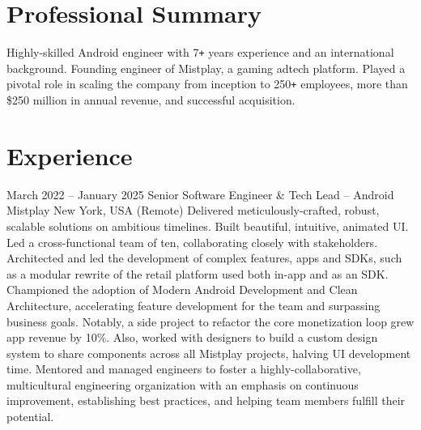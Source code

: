 \documentclass[10pt,a4paper,sans]{moderncv} %
\newcommand{\vs}[0]{\smallskip}
\begin{document}
\makecvtitle %
\vspace{-0.9cm}


\section{Professional Summary}
\vspace{-0.8mm}
Highly-skilled Android engineer with 7\texttt{+} years experience and an international background. Founding engineer of Mistplay, a gaming adtech platform. Played a pivotal role in scaling the company from inception to 250\texttt{+} employees, more than \$250 million in annual revenue, and successful acquisition. 


\section{Experience}


\cventry
{March 2022 -- January 2025}
{Senior Software Engineer \& Tech Lead -- Android}
{{Mistplay}}
{New York, USA (Remote)}
{}{
	Delivered meticulously-crafted, robust, scalable solutions on ambitious timelines. Built beautiful, intuitive, animated UI.
	Led a cross-functional team of ten, collaborating closely with stakeholders.
	Architected and led the development of complex features, apps and SDKs, such as a modular rewrite of the retail platform used both in-app and as an SDK.
	Championed the adoption of Modern Android Development and Clean Architecture, accelerating feature development for the team and surpassing business goals. Notably, a side project to refactor the core monetization loop grew app revenue by 10\%. Also, worked with designers to build a custom design system to share components across all Mistplay projects, halving UI development time.
	Mentored and managed engineers to foster a highly-collaborative, multicultural engineering organization with an emphasis on continuous improvement, establishing best practices, and helping team members fulfill their potential.
}\vs
\end{document}
